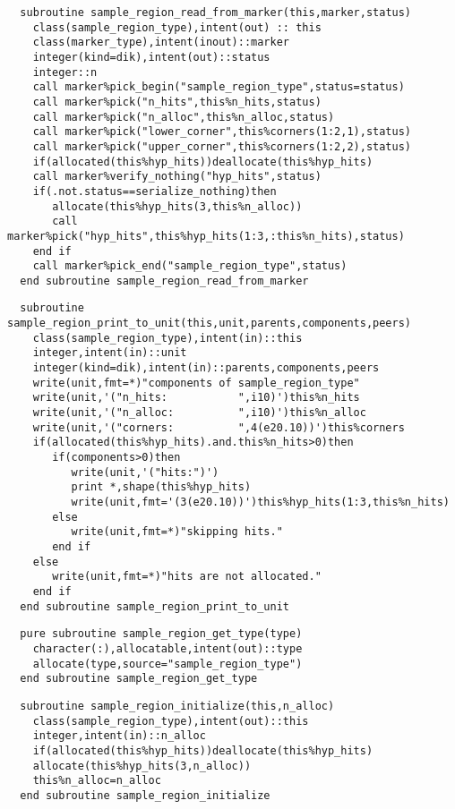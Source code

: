 \begin{Verbatim}
  subroutine sample_region_read_from_marker(this,marker,status)
    class(sample_region_type),intent(out) :: this
    class(marker_type),intent(inout)::marker
    integer(kind=dik),intent(out)::status  
    integer::n
    call marker%pick_begin("sample_region_type",status=status)
    call marker%pick("n_hits",this%n_hits,status)
    call marker%pick("n_alloc",this%n_alloc,status)
    call marker%pick("lower_corner",this%corners(1:2,1),status)
    call marker%pick("upper_corner",this%corners(1:2,2),status)
    if(allocated(this%hyp_hits))deallocate(this%hyp_hits)
    call marker%verify_nothing("hyp_hits",status)
    if(.not.status==serialize_nothing)then
       allocate(this%hyp_hits(3,this%n_alloc))
       call marker%pick("hyp_hits",this%hyp_hits(1:3,:this%n_hits),status)
    end if
    call marker%pick_end("sample_region_type",status)
  end subroutine sample_region_read_from_marker
\end{Verbatim}

\begin{Verbatim}
  subroutine sample_region_print_to_unit(this,unit,parents,components,peers)
    class(sample_region_type),intent(in)::this
    integer,intent(in)::unit
    integer(kind=dik),intent(in)::parents,components,peers
    write(unit,fmt=*)"components of sample_region_type"
    write(unit,'("n_hits:           ",i10)')this%n_hits
    write(unit,'("n_alloc:          ",i10)')this%n_alloc
    write(unit,'("corners:          ",4(e20.10))')this%corners
    if(allocated(this%hyp_hits).and.this%n_hits>0)then
       if(components>0)then
          write(unit,'("hits:")')
          print *,shape(this%hyp_hits)
          write(unit,fmt='(3(e20.10))')this%hyp_hits(1:3,this%n_hits)
       else
          write(unit,fmt=*)"skipping hits."
       end if
    else
       write(unit,fmt=*)"hits are not allocated."
    end if
  end subroutine sample_region_print_to_unit
\end{Verbatim}
 
\begin{Verbatim}
  pure subroutine sample_region_get_type(type)
    character(:),allocatable,intent(out)::type
    allocate(type,source="sample_region_type")
  end subroutine sample_region_get_type
\end{Verbatim}

\begin{Verbatim}
  subroutine sample_region_initialize(this,n_alloc)
    class(sample_region_type),intent(out)::this
    integer,intent(in)::n_alloc
    if(allocated(this%hyp_hits))deallocate(this%hyp_hits)
    allocate(this%hyp_hits(3,n_alloc))
    this%n_alloc=n_alloc
  end subroutine sample_region_initialize
\end{Verbatim}

